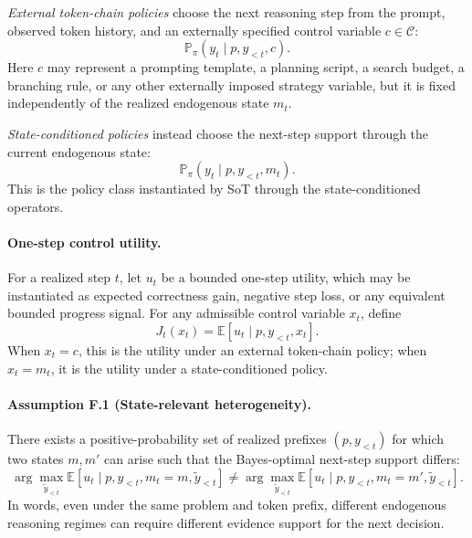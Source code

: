 \emph{External token-chain policies} choose the next reasoning step from the prompt, observed token history, and an externally specified control variable \(c\in\mathcal{C}\):
\begin{equation}
\mathbb{P}_{\pi}(y_t \mid p, y_{<t}, c).
\label{eq:app_ext_policy}
\end{equation}
Here \(c\) may represent a prompting template, a planning script, a search budget, a branching rule, or any other externally imposed strategy variable, but it is fixed independently of the realized endogenous state \(m_t\).

\emph{State-conditioned policies} instead choose the next-step support through the current endogenous state:
\begin{equation}
\mathbb{P}_{\pi}(y_t \mid p, y_{<t}, m_t).
\label{eq:app_state_policy}
\end{equation}
This is the policy class instantiated by SoT through the state-conditioned operators.

\paragraph{One-step control utility.}
For a realized step \(t\), let \(u_t\) be a bounded one-step utility, which may be instantiated as expected correctness gain, negative step loss, or any equivalent bounded progress signal.
For any admissible control variable \(x_t\), define
\begin{equation}
J_t(x_t)
=
\mathbb{E}\!\left[u_t \mid p, y_{<t}, x_t\right].
\label{eq:app_step_utility_policyclass}
\end{equation}
When \(x_t=c\), this is the utility under an external token-chain policy; when \(x_t=m_t\), it is the utility under a state-conditioned policy.

\paragraph{Assumption F.1 (State-relevant heterogeneity).}
There exists a positive-probability set of realized prefixes \((p,y_{<t})\) for which two states \(m,m'\) can arise such that the Bayes-optimal next-step support differs:
\begin{equation}
\arg\max_{\widetilde y_{<t}} 
\mathbb{E}\!\left[u_t \mid p,y_{<t},m_t=m,\widetilde y_{<t}\right]
\neq
\arg\max_{\widetilde y_{<t}} 
\mathbb{E}\!\left[u_t \mid p,y_{<t},m_t=m',\widetilde y_{<t}\right].
\label{eq:app_state_heterogeneity}
\end{equation}
In words, even under the same problem and token prefix, different endogenous reasoning regimes can require different evidence support for the next decision.

